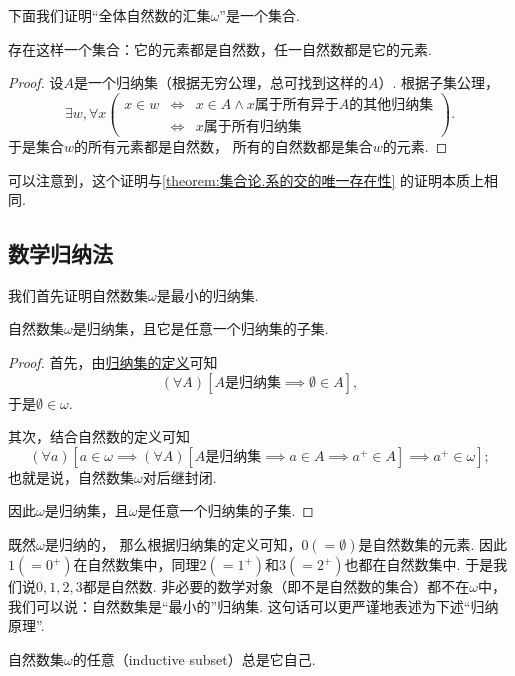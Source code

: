 下面我们证明“全体自然数的汇集\(\omega\)”是一个集合.
\begin{theorem}\label{theorem:集合论.自然数集存在定理}
存在这样一个集合：它的元素都是自然数，任一自然数都是它的元素.
\begin{proof}
设\(A\)是一个归纳集（根据无穷公理，总可找到这样的\(A\)）.
根据子集公理，
\[
	\exists w,
	\forall x
	\left(
		\begin{array}{rcl}
			x \in w
			&\iff&
				x \in A \land \text{\(x\)属于所有异于\(A\)的其他归纳集} \\
			&\iff&
				\text{\(x\)属于所有归纳集}
		\end{array}
	\right).
\]
于是集合\(w\)的所有元素都是自然数，
所有的自然数都是集合\(w\)的元素.
\end{proof}
\end{theorem}
可以注意到，这个证明与\cref{theorem:集合论.系的交的唯一存在性} 的证明本质上相同.

\subsection{数学归纳法}
我们首先证明自然数集\(\omega\)是最小的归纳集.
\begin{theorem}
自然数集\(\omega\)是归纳集，且它是任意一个归纳集的子集.
\begin{proof}
首先，由\hyperref[definition:集合论.归纳集的定义]{归纳集的定义}可知\[
	(\forall A)[\text{\(A\)是归纳集} \implies \emptyset \in A],
\]
于是\(\emptyset \in \omega\).

其次，结合自然数的定义可知\[
	(\forall a)[
		a \in \omega
		\implies
		(\forall A)[
			\text{\(A\)是归纳集} \implies a \in A \implies a^+ \in A
		]
		\implies
		a^+ \in \omega
	];
\]
也就是说，自然数集\(\omega\)对后继封闭.

因此\(\omega\)是归纳集，且\(\omega\)是任意一个归纳集的子集.
\end{proof}
\end{theorem}

既然\(\omega\)是归纳的，
那么根据归纳集的定义可知，\(0(=\emptyset)\)是自然数集的元素.
因此\(1(=0^+)\)在自然数集中，同理\(2(=1^+)\)和\(3(=2^+)\)也都在自然数集中.
于是我们说\(0,1,2,3\)都是自然数.
非必要的数学对象（即不是自然数的集合）都不在\(\omega\)中，
我们可以说：自然数集是“最小的”归纳集.
这句话可以更严谨地表述为下述“归纳原理”.
\begin{theorem}[归纳原理]\label{theorem:集合论.归纳原理1}
自然数集\(\omega\)的任意（{\rm inductive subset}）总是它自己.
\end{theorem}

